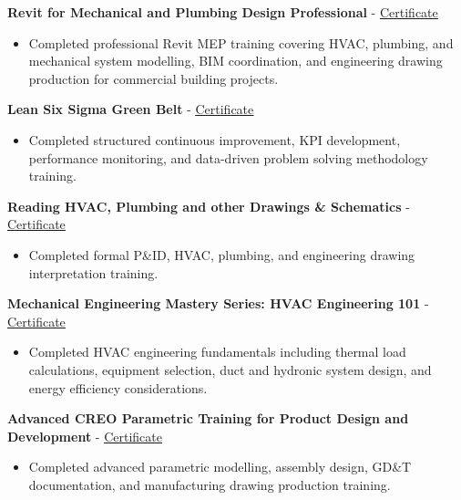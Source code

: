 \documentclass[10pt, letterpaper]{article}
\newcommand{\projheadlink}[3]{\vspace{5pt}\textbf{#1} - \href{#3}{\textcolor{linkblue}{\underline{#2}}}\par\vspace{1pt}}
\begin{document}
\projheadlink{Revit for Mechanical and Plumbing Design Professional}{Certificate}{https://www.linkedin.com/posts/jaykumar-prajapati_revit-mechanicalelectricalandplumbing-share-7291622910157328387-vy8h/?utm_source=share&utm_medium=member_desktop&rcm=ACoAACTudPwBarslMoaDRLUtsgPBCNBE1dj2h5o}
\begin{itemize}
  \item Completed professional Revit MEP training covering HVAC, plumbing, and mechanical system modelling, BIM coordination, and engineering drawing production for commercial building projects.
\end{itemize}

\projheadlink{Lean Six Sigma Green Belt}{Certificate}{https://www.linkedin.com/posts/jaykumar-prajapati_certificate-of-completion-activity-7300948954760851456-I_79?utm_source=share&utm_medium=member_desktop&rcm=ACoAACTudPwBarslMoaDRLUtsgPBCNBE1dj2h5o}
\begin{itemize}
  \item Completed structured continuous improvement, KPI development, performance monitoring, and data-driven problem solving methodology training.
\end{itemize}

\projheadlink{Reading HVAC, Plumbing and other Drawings \& Schematics}{Certificate}{https://www.linkedin.com/posts/jaykumar-prajapati_certificate-activity-7318779620894416897-09O0?utm_source=share&utm_medium=member_desktop&rcm=ACoAACTudPwBarslMoaDRLUtsgPBCNBE1dj2h5o}
\begin{itemize}
  \item Completed formal P\&ID, HVAC, plumbing, and engineering drawing interpretation training.
\end{itemize}

\projheadlink{Mechanical Engineering Mastery Series: HVAC Engineering 101}{Certificate}{https://www.udemy.com/certificate/UC-7c1c67c5-3627-49de-a4a0-8bfb26a648a9/}
\begin{itemize}
  \item Completed HVAC engineering fundamentals including thermal load calculations, equipment selection, duct and hydronic system design, and energy efficiency considerations.
\end{itemize}

\projheadlink{Advanced CREO Parametric Training for Product Design and Development}{Certificate}{https://www.linkedin.com/posts/jaykumar-prajapati_creo-certificate-activity-7303119578220371969-AqJD?utm_source=share&utm_medium=member_desktop&rcm=ACoAACTudPwBarslMoaDRLUtsgPBCNBE1dj2h5o}
\begin{itemize}
  \item Completed advanced parametric modelling, assembly design, GD\&T documentation, and manufacturing drawing production training.
\end{itemize}
\end{document}
